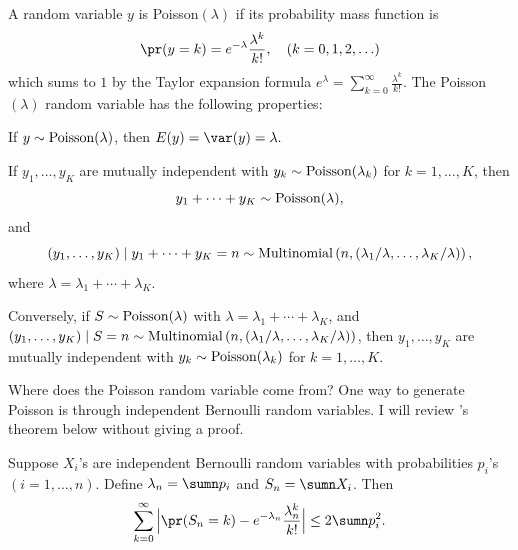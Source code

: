 A random variable $y$ is Poisson$(\lambda)$ if its probability mass
function is
\[
\pr(y=k)=e^{-\lambda}\frac{\lambda^{k}}{k!}, \quad(k=0,1,2,\ldots)
\]
which sums to $1$ by the Taylor expansion formula $e^{\lambda} =  \sum_{k=0}^{\infty}  \frac{\lambda^{k}}{k!}$.
The Poisson$(\lambda)$ random variable has the following properties:
\begin{proposition}
If $y\sim \textup{Poisson} (\lambda)$, then 
$
E(y)=\var(y)=\lambda.
$
\end{proposition}
%
% 
\begin{proposition}
If $y_1, \ldots,  y_K$ are mutually independent with $y_k\sim \textup{Poisson}(\lambda_k)$ for $k=1,\ldots, K$,
then
$$
y_{1}+\cdots + y_{K}  
\sim  \textup{Poisson}(\lambda),
$$
and
$$
(y_{1}, \ldots, y_K) \mid y_{1}+ \cdots + y_{K} = n  
\sim  \textup{Multinomial}\left(n,  (\lambda_1/ \lambda, \ldots, \lambda_K / \lambda ) \right),
$$ 
where $\lambda = \lambda_{1}+ \cdots + \lambda_{K}$. 

Conversely, if $S\sim \textup{Poisson}(\lambda)$ with $\lambda = \lambda_{1}+ \cdots + \lambda_{K}$, and $(y_{1}, \ldots, y_K) \mid S=n \sim \textup{Multinomial}\left(n,   ( \lambda_1/ \lambda, \ldots, \lambda_K / \lambda ) \right)$, then $y_1, \ldots,  y_K$ are mutually independent with $y_k\sim \textup{Poisson}(\lambda_k)$ for $k=1,\ldots, K$. 
\end{proposition}


Where does the Poisson random variable come from? One way to generate Poisson is through independent   Bernoulli random variables. I will review \citet{le1960approximation}'s theorem below without giving a proof.

\begin{theorem}\label{thm::lecam1960theorem}
Suppose $X_i$'s are independent Bernoulli random variables with probabilities $p_i$'s $(i=1,\ldots,n)$. Define $\lambda_n = \sumn p_i$ and $S_n = \sumn X_i$. Then
$$
\sum_{k=0}^{\infty}  \Big |   \pr(S_n = k) - e^{-\lambda_n} \frac{ \lambda_n^k }{ k!}  \Big | \leq 2\sumn p_i^2.
$$
\end{theorem}


